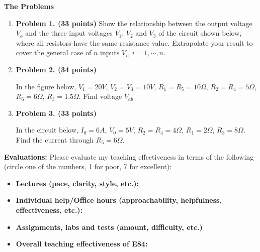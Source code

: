 {\bf The Problems}
\begin{enumerate}

\item {\bf Problem 1. (33 points)} 
Show the relationship between the output voltage $V_o$ and the three input
voltages $V_1$, $V_2$ and $V_3$ of the circuit shown below, where all 
resistors have the same resistance value. Extrapolate your result to cover
the general case of $n$ inputs $V_i$, $i=1,\cdots,n$.


\item {\bf Problem 2. (34 points)} 

In the figure below, $V_1=20V$, $V_2=V_3=10V$, $R_1=R_5=10\Omega$, 
$R_2=R_4=5\Omega$, $R_6=6\Omega$, $R_3=1.5\Omega$. Find voltage $V_{ab}$


\item {\bf Problem 3. (33 points)} 

In the circuit below, $I_0=6A$, $V_0=5V$, $R_2=R_4=4\Omega$, $R_1=2\Omega$,
$R_3=8\Omega$. Find the current through $R_5=6\Omega$.


\end{enumerate}




\item {\bf Evaluations:} Please evaluate my teaching effectiveness in terms 
of the following (circle one of the numbers, 1 for poor, 7 for excellent):

\begin{itemize}
\item {\bf Lectures (pace, clarity, style, etc.):}


\item {\bf Individual help/Office hours (approachability, helpfulness, effectiveness, etc.):}


\item {\bf Assignments, labs and tests (amount, difficulty, etc.)}


\item {\bf Overall teaching effectiveness of E84:} 


\end{itemize}


